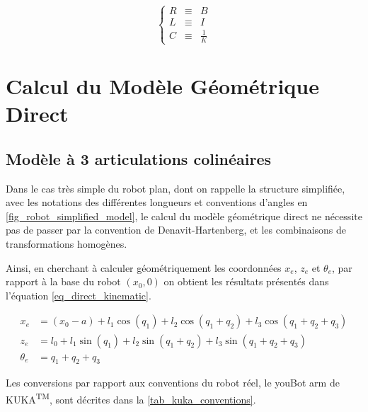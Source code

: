 \begin{appendices}
	\begin{equation}
	\left\{
	\begin{array}{rcl}
	R 	& \equiv &		B \\
	L 	& \equiv & 	I \\
	C	& \equiv & 	\frac{1}{K} 
	\end{array}
	\right.
	\label{eq_impedance_analogy} %
	\end{equation}
	
	\newpage
	\section{Calcul du Modèle Géométrique Direct} \label{app_direct_kinem}
	
	\subsection{Modèle à 3 articulations colinéaires} \label{app_direct_kinem_sub_3}
	
	Dans le cas très simple du robot plan, dont on rappelle la structure simplifiée, avec les notations des différentes longueurs et conventions d'angles en \cref{fig_robot_simplified_model}, le calcul du modèle géométrique direct ne nécessite pas de passer par la convention de Denavit-Hartenberg, et les combinaisons de transformations homogènes.
	
	
	
	Ainsi, en cherchant à calculer géométriquement les coordonnées $ x_e $, $ z_e $ et $ \theta_e $, par rapport à la base du robot $ ( x_0, 0 ) $ on obtient les résultats présentés dans l'équation \cref{eq_direct_kinematic}.
	
	\begin{equation} \label{eq_direct_kinematic}
		\begin{split}
			x_e &= (x_0 - a) + l_1\cos(q_1) + l_2\cos(q_1 + q_2) + l_3\cos(q_1 + q_2 + q_3) \\
			z_e &= l_0 + l_1\sin(q_1) + l_2\sin(q_1 + q_2) + l_3\sin(q_1 + q_2 + q_3) \\
			\theta_e &= q_1 + q_2 + q_3
		\end{split}
	\end{equation}
	
	Les conversions par rapport aux conventions du robot réel, le youBot arm de KUKA\textsuperscript{TM}, sont décrites dans la \cref{tab_kuka_conventions}.
	

\end{appendices}
